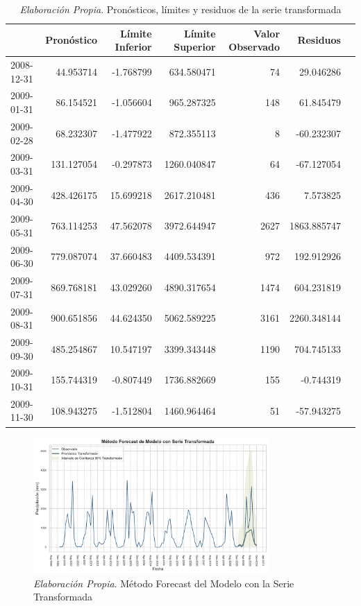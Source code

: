 \documentclass[12pt,letterpaper]{article}   %
\begin{document}
    \begin{table}[ht]
\centering
\footnotesize
\begin{tabular}{lrrrrrr}
\toprule
 & \textbf{Pronóstico} & \textbf{Límite Inferior} & \textbf{Límite Superior} & \textbf{Valor Observado} & \textbf{Residuos} \\
\midrule
2008-12-31 & 44.953714 & -1.768799 & 634.580471 & 74 & 29.046286 \\
2009-01-31 & 86.154521 & -1.056604 & 965.287325 & 148 & 61.845479 \\
2009-02-28 & 68.232307 & -1.477922 & 872.355113 & 8 & -60.232307 \\
2009-03-31 & 131.127054 & -0.297873 & 1260.040847 & 64 & -67.127054 \\
2009-04-30 & 428.426175 & 15.699218 & 2617.210481 & 436 & 7.573825 \\
2009-05-31 & 763.114253 & 47.562078 & 3972.644947 & 2627 & 1863.885747 \\
2009-06-30 & 779.087074 & 37.660483 & 4409.534391 & 972 & 192.912926 \\
2009-07-31 & 869.768181 & 43.029260 & 4890.317654 & 1474 & 604.231819 \\
2009-08-31 & 900.651856 & 44.624350 & 5062.589225 & 3161 & 2260.348144 \\
2009-09-30 & 485.254867 & 10.547197 & 3399.343448 & 1190 & 704.745133 \\
2009-10-31 & 155.744319 & -0.807449 & 1736.882669 & 155 & -0.744319 \\
2009-11-30 & 108.943275 & -1.512804 & 1460.964464 & 51 & -57.943275 \\
\bottomrule
\end{tabular}
\caption{\textit{Elaboración Propia}. Pronósticos, límites y residuos de la serie transformada}
\end{table}


\begin{figure}[ht]
    \centering
    \includegraphics[width=0.8\textwidth]{imagenes/05-03-metodo-forecast-zoom.pdf}
    \caption{\textit{Elaboración Propia}. Método Forecast del Modelo con la Serie Transformada}
\end{figure}
\end{document}
